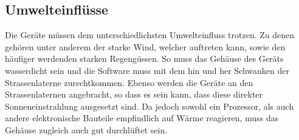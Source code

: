 \subsection{Umwelteinflüsse}
Die Geräte müssen dem unterschiedlichsten Umwelteinfluss trotzen. Zu denen gehören unter anderem der starke Wind, welcher auftreten kann, sowie den häufiger werdenden starken Regengüssen. So muss das Gehäuse des Geräts wasserdicht sein und die Software muss mit dem hin und her Schwanken der Strassenlaterne zurechtkommen. Ebenso werden die Geräte an den Strassenlaternen angebracht, so dass es sein kann, dass diese direkter Sonneneinstrahlung ausgesetzt sind. Da jedoch sowohl ein Prozessor, als auch andere elektronische Bauteile empfindlich auf Wärme reagieren, muss das Gehäuse zugleich auch gut durchlüftet sein.